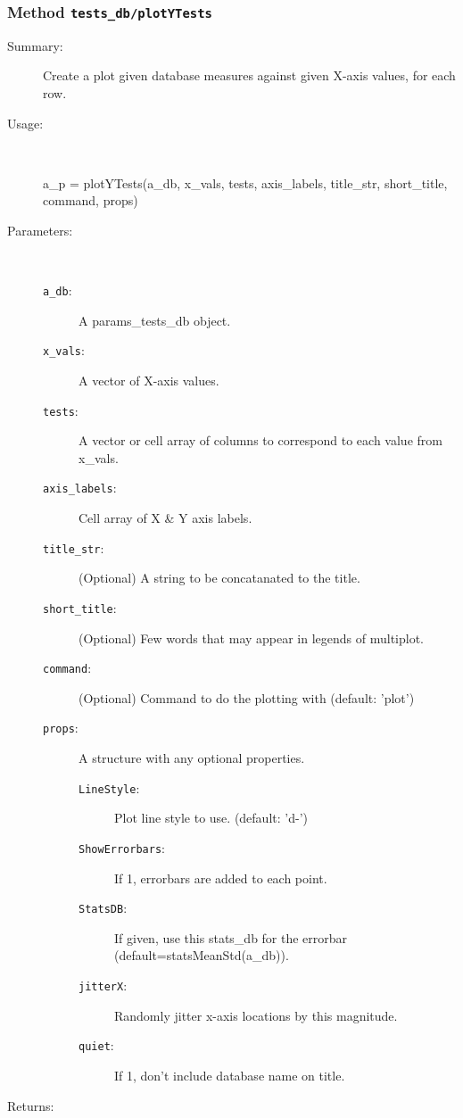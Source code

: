 \subsubsection[Method \texttt{plotYTests}]{Method \texttt{tests\_db/plotYTests}}%
%
\label{ref_tests_db__plotYTests}%
\hypertarget{ref_tests_db__plotYTests}{}%
\begin{description}
\item[Summary:]Create a plot given database measures against given X-axis values, for each row.
%
\item[Usage:]~%
\begin{lyxcode}%
a\_p = plotYTests(a\_db, x\_vals, tests, axis\_labels, title\_str, short\_title, command, props)
%
\end{lyxcode}%
%
%
\item[Parameters:]~
\begin{description}%
\item[\texttt{a\_db}:]
 A params\_tests\_db object.
\item[\texttt{x\_vals}:]
 A vector of X-axis values.
\item[\texttt{tests}:]
 A vector or cell array of columns to correspond to each value from x\_vals.
\item[\texttt{axis\_labels}:]
 Cell array of X \& Y axis labels.
\item[\texttt{title\_str}:]
 (Optional) A string to be concatanated to the title.
\item[\texttt{short\_title}:]
 (Optional) Few words that may appear in legends of multiplot.
\item[\texttt{command}:]
 (Optional) Command to do the plotting with (default: 'plot')
\item[\texttt{props}:]
 A structure with any optional properties.
\begin{description}%
\item[\texttt{LineStyle}:]
 Plot line style to use. (default: 'd-')
\item[\texttt{ShowErrorbars}:]
 If 1, errorbars are added to each point.
\item[\texttt{StatsDB}:]
 If given, use this stats\_db for the errorbar (default=statsMeanStd(a\_db)).
\item[\texttt{jitterX}:]
 Randomly jitter x-axis locations by this magnitude.
\item[\texttt{quiet}:]
 If 1, don't include database name on title.
\end{description}%
\end{description}%
%
\item[Returns:
]~


\end{description}
